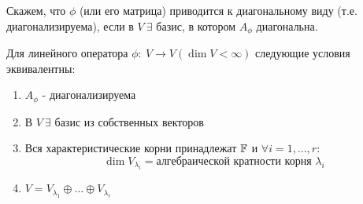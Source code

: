     Скажем, что $\phi$ (или его матрица) приводится к диагональному виду (т.е. диагонализируема), если в $V \ \exists$ базис, в котором $A_\phi$ диагональна.
    \begin{theorem}
        Для линейного оператора $\phi: \ V \to V (\dim V < \infty)$ следующие условия эквивалентны:
        \begin{enumerate}
            \item $A_\phi$ - диагонализируема
            \item В $V \ \exists$ базис из собственных векторов
            \item Вся характеристические корни принадлежат $\mathbb F$ и $\forall i = 1,...,r:$
            $$\dim V_{\lambda_i} = \text{алгебраической кратности корня } \lambda_i$$
            \item $V = V_{\lambda_1} \oplus ... \oplus V_{\lambda_r}$ 
        \end{enumerate}
    \end{theorem}
